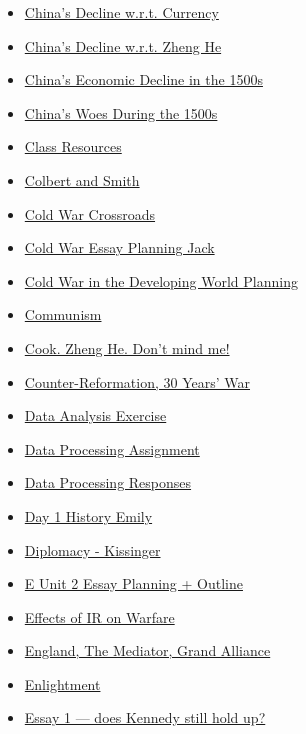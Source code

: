 \documentclass[11pt]{article}
\begin{document}
\begin{itemize}
\begin{itemize}
\item \href{hist201/KBhHIST201ChinasDeclineWRTCurrency.org}{China's Decline w.r.t. Currency}
\item \href{hist201/KBhHIST201ChinasDeclineWRTZhengHe.org}{China's Decline w.r.t. Zheng He}
\item \href{hist201/KBhHIST201ChinasDecline1500.org}{China's Economic Decline in the 1500s}
\item \href{hist201/KBhHIST201ChinaWoes1500.org}{China's Woes During the 1500s}
\item \href{hist201/KBe2020hist201refClassResources.org}{Class Resources}
\item \href{hist201/KBhHIST201ColbertAndSmith.org}{Colbert and Smith}
\item \href{hist201/KBhHIST201ColdWarCrossroads.org}{Cold War Crossroads}
\item \href{hist201/KBhHIST201ColdWarEssayPlanningJack.org}{Cold War Essay Planning Jack}
\item \href{hist201/KBxColdWarDevelopingWorldPlanning.org}{Cold War in the Developing World Planning}
\item \href{hist201/KBhHIST201Communism.org}{Communism}
\item \href{hist201/KBhHIST201CookZhengHe.org}{Cook. Zheng He. Don't mind me!}
\item \href{hist201/KBhHIST201CounterReformation.org}{Counter-Reformation, 30 Years' War}
\item \href{hist201/KBxDataAnalysisExercise.org}{Data Analysis Exercise}
\item \href{hist201/KBDataProcessingRett.org}{Data Processing Assignment}
\item \href{hist201/KBdataProsResponses.org}{Data Processing Responses}
\item \href{hist201/KB20200825102230.org}{Day 1 History Emily}
\item \href{hist201/KBhHIST201Kissinger.org}{Diplomacy - Kissinger}
\item \href{hist201/KBe20hist201retUnit2Essay.org}{E Unit 2 Essay Planning + Outline}
\item \href{hist201/KBhHIST201IRonWarfare.org}{Effects of IR on Warfare}
\item \href{hist201/KBhHIST201EnglandMediator.org}{England, The Mediator, Grand Alliance}
\item \href{hist201/KBhHIST201Enlightenment.org}{Enlightment}
\item \href{hist201/KBhHIST201KennedyStillHoldsUp.org}{Essay 1 --- does Kennedy still hold up?}

\end{itemize}
\end{itemize}
\end{document}
